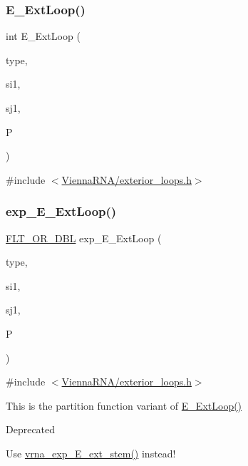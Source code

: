\subsubsection{\texorpdfstring{E\+\_\+\+Ext\+Loop()}{E\_ExtLoop()}}
{\footnotesize\ttfamily int E\+\_\+\+Ext\+Loop (\begin{DoxyParamCaption}\item[{int}]{type,  }\item[{int}]{si1,  }\item[{int}]{sj1,  }\item[{\mbox{\hyperlink{group__energy__parameters_ga8a69ca7d787e4fd6079914f5343a1f35}{vrna\+\_\+param\+\_\+t}} $\ast$}]{P }\end{DoxyParamCaption})}



{\ttfamily \#include $<$\mbox{\hyperlink{exterior__loops_8h}{Vienna\+R\+N\+A/exterior\+\_\+loops.\+h}}$>$}

\mbox{\label{group__loops_ga446828a191c127861e76e2c84055f672}} 
\subsubsection{\texorpdfstring{exp\+\_\+\+E\+\_\+\+Ext\+Loop()}{exp\_E\_ExtLoop()}}
{\footnotesize\ttfamily \mbox{\hyperlink{group__data__structures_ga31125aeace516926bf7f251f759b6126}{F\+L\+T\+\_\+\+O\+R\+\_\+\+D\+BL}} exp\+\_\+\+E\+\_\+\+Ext\+Loop (\begin{DoxyParamCaption}\item[{int}]{type,  }\item[{int}]{si1,  }\item[{int}]{sj1,  }\item[{\mbox{\hyperlink{group__energy__parameters_ga01d8b92fe734df8d79a6169482c7d8d8}{vrna\+\_\+exp\+\_\+param\+\_\+t}} $\ast$}]{P }\end{DoxyParamCaption})}



{\ttfamily \#include $<$\mbox{\hyperlink{exterior__loops_8h}{Vienna\+R\+N\+A/exterior\+\_\+loops.\+h}}$>$}

This is the partition function variant of \mbox{\hyperlink{group__loops_ga05c6288c5a79d3bd5ad6d33c1bb34bd0}{E\+\_\+\+Ext\+Loop()}} \begin{DoxyRefDesc}{Deprecated}
\item[\mbox{\hyperlink{deprecated__deprecated000064}{Deprecated}}]Use \mbox{\hyperlink{group__loops_ga357484958d3cd677f88f16c75c8a5730}{vrna\+\_\+exp\+\_\+\+E\+\_\+ext\+\_\+stem()}} instead!\end{DoxyRefDesc}


